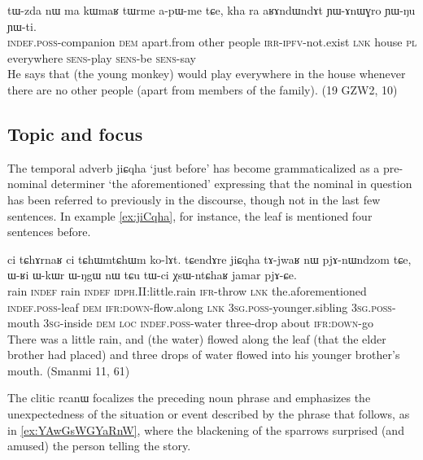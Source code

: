 \documentclass[oldfontcommands,oneside,a4paper,11pt]{article}
\newcommand{\ipa}[1]{{\phon #1}} %
\begin{document}
\begin{exe}
\ex \label{ex:khara}
\gll
\ipa{tɯ-zda} 	\ipa{nɯ} 	\ipa{ma} 	\ipa{kɯmaʁ} 	\ipa{tɯrme} 	\ipa{a-pɯ-me} 	\ipa{tɕe,} 	\ipa{kha} 	\ipa{ra} 	\ipa{aʁɤndɯndɤt} \ipa{ɲɯ-ɤnɯɣro} 	\ipa{ɲɯ-ŋu} 	\ipa{ɲɯ-ti.} \\
\textsc{indef.poss}-companion \textsc{dem} apart.from other people \textsc{irr-ipfv}-not.exist \textsc{lnk} house \textsc{pl} everywhere \textsc{sens}-play \textsc{sens}-be \textsc{sens}-say \\
\glt He says that (the young monkey) would play everywhere in the house whenever there are no other people (apart from members of the family). (19 GZW2, 10)
\end{exe}

\subsection{Topic and focus} 

The temporal adverb \ipa{jiɕqha} `just before' has become grammaticalized as a pre-nominal determiner `the aforementioned' expressing that the nominal in question has been referred to previously in the discourse, though not in the last few sentences. In example \ref{ex:jiCqha}, for instance, the leaf is mentioned four sentences before.

\begin{exe}
\ex \label{ex:jiCqha}
 \gll \ipa{tɯmɯ} 	\ipa{ci} 	\ipa{tɕhɤrnaʁ} 	\ipa{ci} 	\ipa{tɕhɯmtɕhɯm} 	\ipa{ko-lɤt.} 	\ipa{tɕendɤre} 	\ipa{jiɕqha} 	\ipa{tɤ-jwaʁ} 	\ipa{nɯ} 	\ipa{pjɤ-nɯndzom} 	\ipa{tɕe,} 	\ipa{ɯ-ʁi} 	\ipa{ɯ-kɯr} 	\ipa{ɯ-ŋgɯ} 	\ipa{nɯ} 	\ipa{tɕu} 	\ipa{tɯ-ci} 	\ipa{χsɯ-ntɕhaʁ} 	\ipa{jamar} 	\ipa{pjɤ-ɕe.} \\
 rain \textsc{indef}  rain \textsc{indef} \textsc{idph}.II:little.rain \textsc{ifr}-throw \textsc{lnk} the.aforementioned \textsc{indef.poss}-leaf \textsc{dem} \textsc{ifr:down}-flow.along \textsc{lnk} \textsc{3sg.poss}-younger.sibling  \textsc{3sg.poss}-mouth \textsc{3sg}-inside \textsc{dem} \textsc{loc} \textsc{indef.poss}-water three-drop about \textsc{ifr:down}-go \\
 \glt There was a little rain, and (the water) flowed along the leaf (that the elder brother had placed) and three drops of water flowed into his younger brother's mouth. (Smanmi 11, 61)
\end{exe}

 
The clitic \ipa{rcanɯ} focalizes the preceding noun phrase and emphasizes the unexpectedness of the situation or event described by the phrase that follows, as in \ref{ex:YAwGsWGYaRnW}, where the blackening of the sparrows surprised (and amused) the person telling the story.
\end{document}
